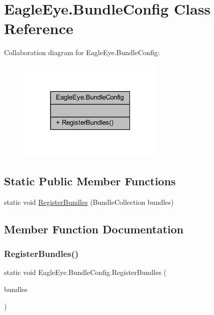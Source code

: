 \hypertarget{class_eagle_eye_1_1_bundle_config}{}\section{Eagle\+Eye.\+Bundle\+Config Class Reference}
\label{class_eagle_eye_1_1_bundle_config}


Collaboration diagram for Eagle\+Eye.\+Bundle\+Config\+:\nopagebreak
\begin{figure}[H]
\begin{center}
\leavevmode
\includegraphics[width=199pt]{class_eagle_eye_1_1_bundle_config__coll__graph}
\end{center}
\end{figure}
\subsection*{Static Public Member Functions}
\begin{DoxyCompactItemize}
\item 
static void \mbox{\hyperlink{class_eagle_eye_1_1_bundle_config_a4ce4ae5f3885f62a66a8b7d85c756143}{Register\+Bundles}} (Bundle\+Collection bundles)
\end{DoxyCompactItemize}


\subsection{Member Function Documentation}
\mbox{\label{class_eagle_eye_1_1_bundle_config_a4ce4ae5f3885f62a66a8b7d85c756143}} 
\subsubsection{\texorpdfstring{RegisterBundles()}{RegisterBundles()}}
{\footnotesize\ttfamily static void Eagle\+Eye.\+Bundle\+Config.\+Register\+Bundles (\begin{DoxyParamCaption}\item[{Bundle\+Collection}]{bundles }\end{DoxyParamCaption})\hspace{0.3cm}{\ttfamily [static]}}

